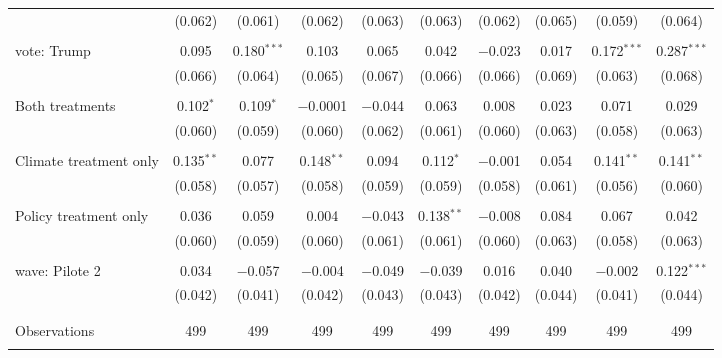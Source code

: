 \begin{tabular}{@{\extracolsep{5pt}}lccccccccc}
  & (0.062) & (0.061) & (0.062) & (0.063) & (0.063) & (0.062) & (0.065) & (0.059) & (0.064) \\ 
  & & & & & & & & & \\ 
 vote: Trump & 0.095 & 0.180$^{***}$ & 0.103 & 0.065 & 0.042 & $-$0.023 & 0.017 & 0.172$^{***}$ & 0.287$^{***}$ \\ 
  & (0.066) & (0.064) & (0.065) & (0.067) & (0.066) & (0.066) & (0.069) & (0.063) & (0.068) \\ 
  & & & & & & & & & \\ 
 Both treatments & 0.102$^{*}$ & 0.109$^{*}$ & $-$0.0001 & $-$0.044 & 0.063 & 0.008 & 0.023 & 0.071 & 0.029 \\ 
  & (0.060) & (0.059) & (0.060) & (0.062) & (0.061) & (0.060) & (0.063) & (0.058) & (0.063) \\ 
  & & & & & & & & & \\ 
 Climate treatment only & 0.135$^{**}$ & 0.077 & 0.148$^{**}$ & 0.094 & 0.112$^{*}$ & $-$0.001 & 0.054 & 0.141$^{**}$ & 0.141$^{**}$ \\ 
  & (0.058) & (0.057) & (0.058) & (0.059) & (0.059) & (0.058) & (0.061) & (0.056) & (0.060) \\ 
  & & & & & & & & & \\ 
 Policy treatment only & 0.036 & 0.059 & 0.004 & $-$0.043 & 0.138$^{**}$ & $-$0.008 & 0.084 & 0.067 & 0.042 \\ 
  & (0.060) & (0.059) & (0.060) & (0.061) & (0.061) & (0.060) & (0.063) & (0.058) & (0.063) \\ 
  & & & & & & & & & \\ 
 wave: Pilote 2 & 0.034 & $-$0.057 & $-$0.004 & $-$0.049 & $-$0.039 & 0.016 & 0.040 & $-$0.002 & 0.122$^{***}$ \\ 
  & (0.042) & (0.041) & (0.042) & (0.043) & (0.043) & (0.042) & (0.044) & (0.041) & (0.044) \\ 
  & & & & & & & & & \\ 
\hline \\[-1.8ex] 

Observations & 499 & 499 & 499 & 499 & 499 & 499 & 499 & 499 & 499 \\ 
\hline 
\hline \\[-1.8ex] 
\end{tabular} 